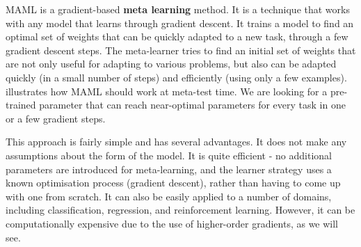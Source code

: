 MAML is a gradient-based \textbf{meta learning} method. It is a technique that works with any model that learns through gradient descent. It trains a model to find an optimal set of weights that can be quickly adapted to a new task, through a few gradient descent steps. The meta-learner tries to find an initial set of weights that are not only useful for adapting to various problems, but also can be adapted quickly (in a small number of steps) and efficiently (using only a few examples).
 illustrates how MAML should work at meta-test time. We are looking for a pre-trained parameter that can reach near-optimal parameters for every task in one or a few gradient steps.

This approach is fairly simple and has several advantages. It does not make any assumptions about the form of the model. It is quite efficient - no additional parameters are introduced for meta-learning, and the learner strategy uses a known optimisation process (gradient descent), rather than having to come up with one from scratch. It can also be easily applied to a number of domains, including classification, regression, and reinforcement learning. However, it can be computationally expensive due to the use of higher-order gradients, as we will see.

